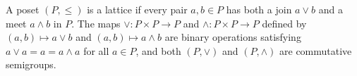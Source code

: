 A poset $(P, \leq)$ is a lattice if every pair $a, b \in P$ has both a join $a \vee b$ and a meet $a \wedge b$ in $P$. The maps $\vee: P \times P \to P$ and $\wedge: P \times P \to P$ defined by $(a, b) \mapsto a \vee b$ and $(a, b) \mapsto a \wedge b$ are binary operations satisfying $a \vee a = a = a \wedge a$ for all $a \in P$, and both $(P, \vee)$ and $(P, \wedge)$ are commutative semigroups.
